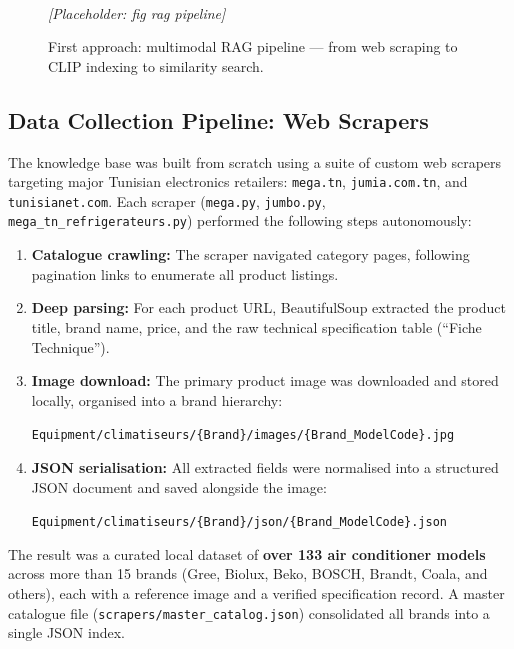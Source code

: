 \begin{figure}[htbp]
  \centering
  \framebox[\linewidth]{\rule{0pt}{4cm}}
  \\[4pt]
  {\small\textit{[Placeholder: fig rag pipeline]}}  
  
  \caption{First approach: multimodal RAG pipeline — from web scraping to CLIP indexing to similarity search.}
  \label{fig:ch4-rag-pipeline}
\end{figure}

\subsection{Data Collection Pipeline: Web Scrapers}

The knowledge base was built from scratch using a suite of custom web scrapers targeting major Tunisian electronics retailers: \texttt{mega.tn}, \texttt{jumia.com.tn}, and \texttt{tunisianet.com}. Each scraper (\texttt{mega.py}, \texttt{jumbo.py}, \texttt{mega\_tn\_refrigerateurs.py}) performed the following steps autonomously:

\begin{enumerate}
  \item \textbf{Catalogue crawling:} The scraper navigated category pages, following pagination links to enumerate all product listings.
  \item \textbf{Deep parsing:} For each product URL, BeautifulSoup extracted the product title, brand name, price, and the raw technical specification table (``Fiche Technique'').
  \item \textbf{Image download:} The primary product image was downloaded and stored locally, organised into a brand hierarchy:
  \begin{center}
    \texttt{Equipment/climatiseurs/\{Brand\}/images/\{Brand\_ModelCode\}.jpg}
  \end{center}
  \item \textbf{JSON serialisation:} All extracted fields were normalised into a structured JSON document and saved alongside the image:
  \begin{center}
    \texttt{Equipment/climatiseurs/\{Brand\}/json/\{Brand\_ModelCode\}.json}
  \end{center}
\end{enumerate}

The result was a curated local dataset of \textbf{over 133 air conditioner models} across more than 15 brands (Gree, Biolux, Beko, BOSCH, Brandt, Coala, and others), each with a reference image and a verified specification record. A master catalogue file (\texttt{scrapers/master\_catalog.json}) consolidated all brands into a single JSON index.

